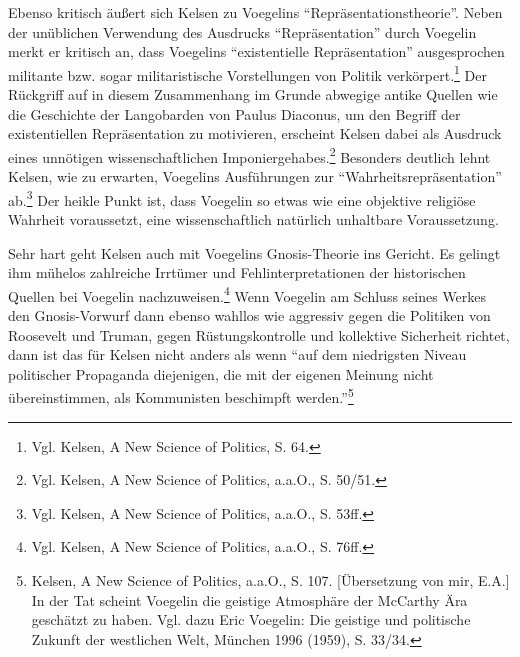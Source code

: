\documentclass[12pt,a4paper,ngerman]{article}
\begin{document}
Ebenso kritisch äußert sich Kelsen zu Voegelins "`Repräsentationstheorie"'.
Neben der unüblichen Verwendung des Ausdrucks "`Repräsentation"' durch
Voegelin merkt er kritisch an, dass Voegelins "`existentielle Repräsentation"'
ausgesprochen militante bzw. sogar militaristische Vorstellungen von Politik
verkörpert.\footnote{Vgl. Kelsen, A New Science of Politics, S. 64.}  Der
Rückgriff auf in diesem Zusammenhang im Grunde abwegige antike Quellen wie die
Geschichte der Langobarden von Paulus Diaconus, um den Begriff der
existentiellen Repräsentation zu motivieren, erscheint Kelsen dabei als
Ausdruck eines unnötigen wissenschaftlichen Imponiergehabes.\footnote{Vgl.
  Kelsen, A New Science of Politics, a.a.O., S. 50/51.} Besonders deutlich
lehnt Kelsen, wie zu erwarten, Voegelins Ausführungen zur
"`Wahrheitsrepräsentation"' ab.\footnote{Vgl. Kelsen, A New Science of
  Politics, a.a.O., S. 53ff.}  Der heikle Punkt ist, dass Voegelin so etwas
wie eine objektive religiöse Wahrheit voraussetzt, eine wissenschaftlich
natürlich unhaltbare Voraussetzung.

Sehr hart geht Kelsen auch mit Voegelins Gnosis-Theorie ins Gericht.  Es
gelingt ihm mühelos zahlreiche Irrtümer und Fehlinterpretationen der
historischen Quellen bei Voegelin nachzuweisen.\footnote{Vgl.  Kelsen, A New
  Science of Politics, a.a.O., S. 76ff.} Wenn Voegelin am Schluss seines
Werkes den Gnosis-Vorwurf dann ebenso wahllos wie aggressiv gegen die
Politiken von Roosevelt und Truman, gegen Rüstungskontrolle und kollektive
Sicherheit richtet, dann ist das für Kelsen nicht anders als wenn "`auf dem
niedrigsten Niveau politischer Propaganda diejenigen, die mit der eigenen
Meinung nicht übereinstimmen, als Kommunisten beschimpft
werden."'\footnote{Kelsen, A New Science of Politics, a.a.O., S. 107.
  [Übersetzung von mir, E.A.] In der Tat scheint Voegelin die geistige
  Atmosphäre der McCarthy Ära geschätzt zu haben. Vgl. dazu Eric Voegelin: Die
  geistige und politische Zukunft der westlichen Welt, München 1996 (1959), S.
  33/34.}
\end{document}
